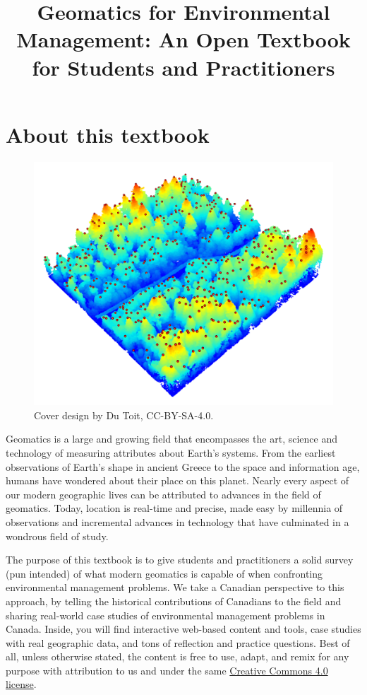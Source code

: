 \documentclass[
]{book}
\title{Geomatics for Environmental Management: An Open Textbook for Students and Practitioners}
\author{}
\date{\vspace{-2.5em}}
\begin{document}
\maketitle

{
\setcounter{tocdepth}{1}
\tableofcontents
}
\chapter*{About this textbook}\label{about-this-textbook}

\begin{figure}
\includegraphics[width=0.75\linewidth]{images/15-las-treetops} \caption{Cover design by Du Toit, CC-BY-SA-4.0.}\label{fig:00-book-cover}
\end{figure}

Geomatics is a large and growing field that encompasses the art, science and technology of measuring attributes about Earth's systems. From the earliest observations of Earth's shape in ancient Greece to the space and information age, humans have wondered about their place on this planet. Nearly every aspect of our modern geographic lives can be attributed to advances in the field of geomatics. Today, location is real-time and precise, made easy by millennia of observations and incremental advances in technology that have culminated in a wondrous field of study.

The purpose of this textbook is to give students and practitioners a solid survey (pun intended) of what modern geomatics is capable of when confronting environmental management problems. We take a Canadian perspective to this approach, by telling the historical contributions of Canadians to the field and sharing real-world case studies of environmental management problems in Canada. Inside, you will find interactive web-based content and tools, case studies with real geographic data, and tons of reflection and practice questions. Best of all, unless otherwise stated, the content is free to use, adapt, and remix for any purpose with attribution to us and under the same \href{https://creativecommons.org/licenses/by-sa/4.0/}{Creative Commons 4.0 license}.
\end{document}
